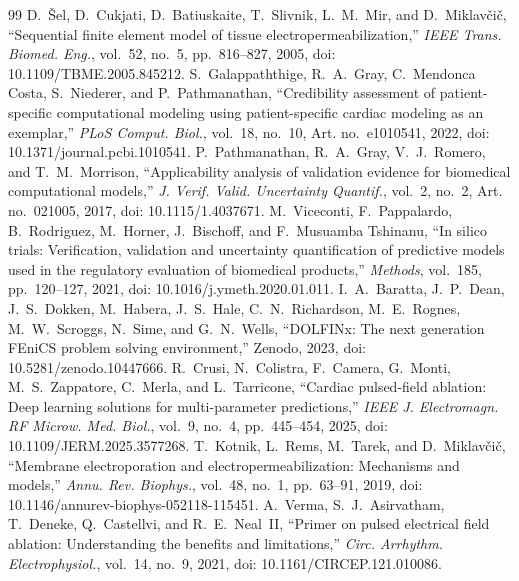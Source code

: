 \documentclass[11pt]{article}
\begin{document}
\begin{thebibliography}{99}
 D.~\v{S}el, D.~Cukjati, D.~Batiuskaite, T.~Slivnik, L.~M.~Mir, and D.~Miklav\v{c}i\v{c}, ``Sequential finite element model of tissue electropermeabilization,'' \emph{IEEE Trans. Biomed. Eng.}, vol.~52, no.~5, pp.~816--827, 2005, doi: 10.1109/TBME.2005.845212.
 S.~Galappaththige, R.~A.~Gray, C.~Mendonca Costa, S.~Niederer, and P.~Pathmanathan, ``Credibility assessment of patient-specific computational modeling using patient-specific cardiac modeling as an exemplar,'' \emph{PLoS Comput. Biol.}, vol.~18, no.~10, Art. no.~e1010541, 2022, doi: 10.1371/journal.pcbi.1010541.
 P.~Pathmanathan, R.~A.~Gray, V.~J.~Romero, and T.~M.~Morrison, ``Applicability analysis of validation evidence for biomedical computational models,'' \emph{J. Verif. Valid. Uncertainty Quantif.}, vol.~2, no.~2, Art. no.~021005, 2017, doi: 10.1115/1.4037671.
 M.~Viceconti, F.~Pappalardo, B.~Rodriguez, M.~Horner, J.~Bischoff, and F.~Musuamba Tshinanu, ``In silico trials: Verification, validation and uncertainty quantification of predictive models used in the regulatory evaluation of biomedical products,'' \emph{Methods}, vol.~185, pp.~120--127, 2021, doi: 10.1016/j.ymeth.2020.01.011.
 I.~A.~Baratta, J.~P.~Dean, J.~S.~Dokken, M.~Habera, J.~S.~Hale, C.~N.~Richardson, M.~E.~Rognes, M.~W.~Scroggs, N.~Sime, and G.~N.~Wells, ``DOLFINx: The next generation FEniCS problem solving environment,'' Zenodo, 2023, doi: 10.5281/zenodo.10447666.
 R.~Crusi, N.~Colistra, F.~Camera, G.~Monti, M.~S.~Zappatore, C.~Merla, and L.~Tarricone, ``Cardiac pulsed-field ablation: Deep learning solutions for multi-parameter predictions,'' \emph{IEEE J. Electromagn. RF Microw. Med. Biol.}, vol.~9, no.~4, pp.~445--454, 2025, doi: 10.1109/JERM.2025.3577268.
 T.~Kotnik, L.~Rems, M.~Tarek, and D.~Miklav\v{c}i\v{c}, ``Membrane electroporation and electropermeabilization: Mechanisms and models,'' \emph{Annu. Rev. Biophys.}, vol.~48, no.~1, pp.~63--91, 2019, doi: 10.1146/annurev-biophys-052118-115451.
 A.~Verma, S.~J.~Asirvatham, T.~Deneke, Q.~Castellvi, and R.~E.~Neal~II, ``Primer on pulsed electrical field ablation: Understanding the benefits and limitations,'' \emph{Circ. Arrhythm. Electrophysiol.}, vol.~14, no.~9, 2021, doi: 10.1161/CIRCEP.121.010086.
\end{thebibliography}
\end{document}
